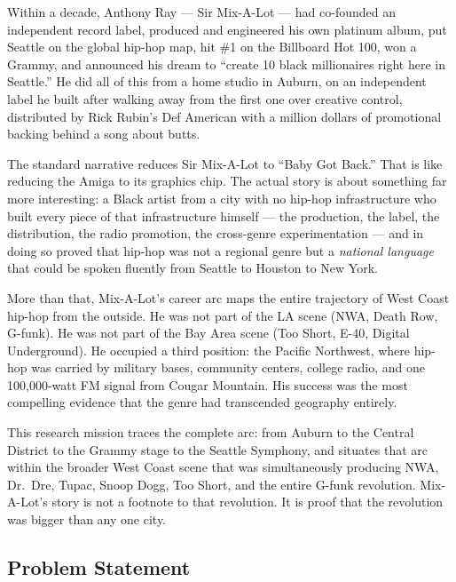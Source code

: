 \documentclass[11pt,letterpaper]{article}
\begin{document}
Within a decade, Anthony Ray --- Sir Mix-A-Lot --- had co-founded an independent record label, produced and engineered his own platinum album, put Seattle on the global hip-hop map, hit \#1 on the Billboard Hot 100, won a Grammy, and announced his dream to ``create 10 black millionaires right here in Seattle.'' He did all of this from a home studio in Auburn, on an independent label he built after walking away from the first one over creative control, distributed by Rick Rubin's Def American with a million dollars of promotional backing behind a song about butts.

The standard narrative reduces Sir Mix-A-Lot to ``Baby Got Back.'' That is like reducing the Amiga to its graphics chip. The actual story is about something far more interesting: a Black artist from a city with no hip-hop infrastructure who built every piece of that infrastructure himself --- the production, the label, the distribution, the radio promotion, the cross-genre experimentation --- and in doing so proved that hip-hop was not a regional genre but a \textit{national language} that could be spoken fluently from Seattle to Houston to New York.

More than that, Mix-A-Lot's career arc maps the entire trajectory of West Coast hip-hop from the outside. He was not part of the LA scene (NWA, Death Row, G-funk). He was not part of the Bay Area scene (Too Short, E-40, Digital Underground). He occupied a third position: the Pacific Northwest, where hip-hop was carried by military bases, community centers, college radio, and one 100,000-watt FM signal from Cougar Mountain. His success was the most compelling evidence that the genre had transcended geography entirely.

This research mission traces the complete arc: from Auburn to the Central District to the Grammy stage to the Seattle Symphony, and situates that arc within the broader West Coast scene that was simultaneously producing NWA, Dr.~Dre, Tupac, Snoop Dogg, Too Short, and the entire G-funk revolution. Mix-A-Lot's story is not a footnote to that revolution. It is proof that the revolution was bigger than any one city.

\subsection{Problem Statement}
\end{document}
